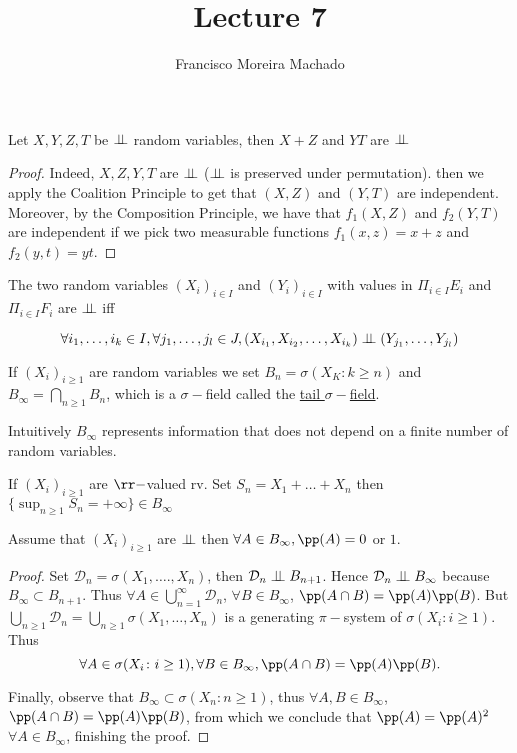 \documentclass[../main.tex]{subfiles}
\author{Francisco Moreira Machado}
\title{Lecture 7}
\begin{document}
 \begin{application}
   Let $X, Y, Z, T$ be $\perp\!\!\!\!\,\perp$ random variables, then $X + Z$ and $YT$ are $\perp\!\!\!\!\,\perp$
 \end{application} 
 \begin{proof}
   Indeed, $X, Z, Y, T$ are $\perp\!\!\!\!\,\perp$ ($\perp\!\!\!\!\,\perp$ is preserved under permutation).
   then we apply the Coalition Principle to get that $(X, Z)$ and $(Y, T)$ are 
   independent. Moreover, by the Composition Principle, we have that $f_1(X, Z)$ and 
   $f_2(Y, T)$ are independent if we pick two measurable functions $f_1(x, z) = x + z$ and 
   $f_2(y, t) = yt$.
 \end{proof}

 \begin{lemma}
   The two random variables $(X_i)_{i \in I}$ and $(Y_i)_{i \in I}$ with values in 
   $\Pi_{i \in I} E_i$ and $\Pi_{i \in I} F_i$ are $\perp\!\!\!\!\,\perp$ iff
   
   $$\forall i_1, \ldots, i_k \in I, \forall j_1, \ldots, j_l \in
   J, (X_{i_1}, X_{i_2}, \ldots, X_{i_k}) \perp\!\!\!\!\,\perp (Y_{j_1}, \ldots,
   Y_{j_l})$$
 \end{lemma}

 \begin{definition}
   If $(X_i)_{i \geq 1}$ are random variables we set $B_n = \sigma(X_K
   \colon k \geq n)$ and $B_{\infty} = \bigcap_{n \geq 1}B_n$, which
   is a $\sigma-$field called the \underline{tail $\sigma-$field}.
 \end{definition}

 Intuitively $B_{\infty}$ represents information that does not
 depend on a finite number of random variables.

 \begin{example}
   If $(X_i)_{i \geq 1}$ are $\rr-$valued rv. Set $S_n = X_1 + \ldots
   + X_n$ then $\{ \sup_{n \geq 1} S_n = +\infty \} \in B_{\infty} $
 \end{example}

 \begin{theorem}
   Assume that $(X_i)_{i \geq 1}$ are $\perp\!\!\!\!\,\perp$ then $\forall A \in
   B_{\infty}, \pp(A) = 0$ or $1$.
 \end{theorem}
 \begin{proof}
   Set $\mathcal{D}_n = \sigma(X_1, \ldots., X_n)$, then $\mathcal{D}_n
   \perp\!\!\!\!\,\perp B_{n+1}$. Hence $\mathcal{D}_n \perp\!\!\!\!\,\perp B_{\infty}$ because
   $B_{\infty} \subset B_{n+1}$.
   Thus $\forall A \in \bigcup_{n = 1}^\infty \mathcal{D}_n$, $\forall
   B \in B_{\infty}$, $\pp(A \cap B) = \pp(A)\pp(B)$. But $\bigcup_{n
   \geq 1} \mathcal{D}_n = \bigcup_{n \geq 1} \sigma(X_1,\ldots,
   X_n)$ is a generating $\pi-$system of $\sigma(X_i \colon i\geq 1)$.
   Thus
   \[
     \forall A \in \sigma(X_i\colon i \geq 1), \forall B \in
     B_{\infty}, \pp(A \cap B) = \pp(A) \pp(B)
   .\] 

 Finally, observe that $B_{\infty} \subset \sigma(X_n \colon n \geq
   1)$, thus $\forall A, B \in B_{\infty}$, $\pp(A \cap B) =
   \pp(A)\pp(B)$, from which we conclude that $\pp(A) = \pp(A)^2$
   $\forall A \in B_{\infty}$, finishing the proof.
 \end{proof} 
\end{document}
